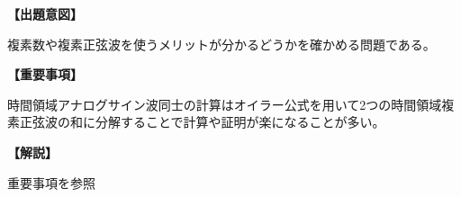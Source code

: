 \noindent \textbf{【出題意図】}

\bigskip
\noindent 複素数や複素正弦波を使うメリットが分かるどうかを確かめる問題である。

\vspace{1em}
\noindent \textbf{【重要事項】}

\medskip
\noindent 時間領域アナログサイン波同士の計算はオイラー公式を用いて2つの時間領域複素正弦波の和に分解することで計算や証明が楽になることが多い。

\bigskip

\vspace{1em}
\noindent \textbf{【解説】}

重要事項を参照
